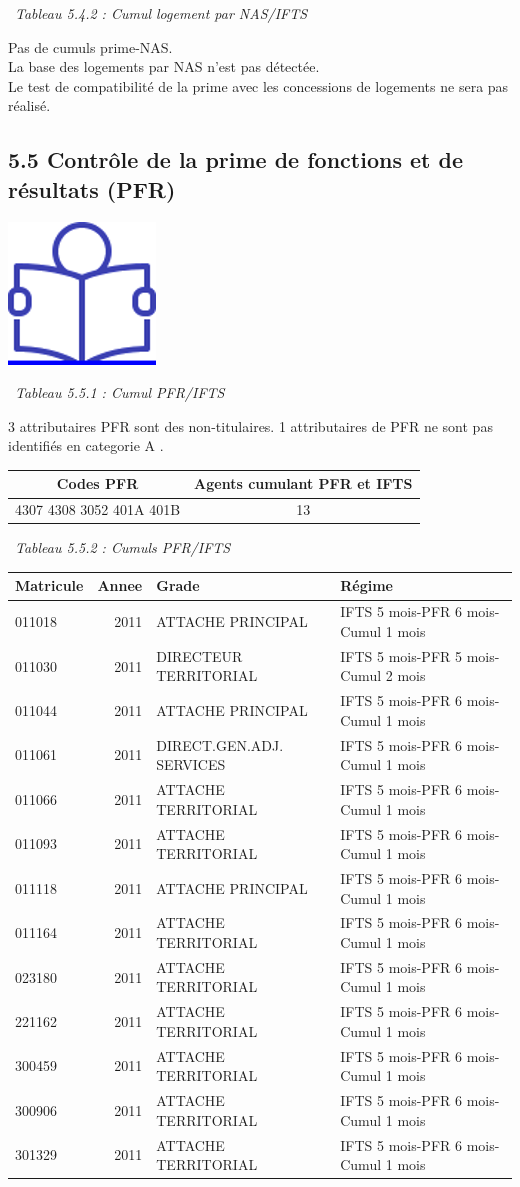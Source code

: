 ~\emph{Tableau 5.4.2 : Cumul logement par NAS/IFTS}

Pas de cumuls prime-NAS.\\
La base des logements par NAS n'est pas détectée.\\
Le test de compatibilité de la prime avec les concessions de logements
ne sera pas réalisé.

\hypertarget{controle-de-la-prime-de-fonctions-et-de-resultats-pfr}{%
\subsection{5.5 Contrôle de la prime de fonctions et de résultats
(PFR)}\label{controle-de-la-prime-de-fonctions-et-de-resultats-pfr}}

\href{../Docs/Notices/fiche_PFR.odt}{\includegraphics{icones/Notice.png}}

~\emph{Tableau 5.5.1 : Cumul PFR/IFTS}

3 attributaires PFR sont des non-titulaires. 1 attributaires de PFR ne
sont pas identifiés en categorie A .

\begin{longtable}[]{@{}cc@{}}
\toprule
Codes PFR & Agents cumulant PFR et IFTS\tabularnewline
\midrule
\endhead
4307 4308 3052 401A 401B & 13\tabularnewline
\bottomrule
\end{longtable}

~\emph{Tableau 5.5.2 : Cumuls PFR/IFTS}

\begin{longtable}[]{@{}lrll@{}}
\toprule
Matricule & Annee & Grade & Régime\tabularnewline
\midrule
\endhead
011018 & 2011 & ATTACHE PRINCIPAL & IFTS 5 mois-PFR 6 mois-Cumul 1
mois\tabularnewline
011030 & 2011 & DIRECTEUR TERRITORIAL & IFTS 5 mois-PFR 5 mois-Cumul 2
mois\tabularnewline
011044 & 2011 & ATTACHE PRINCIPAL & IFTS 5 mois-PFR 6 mois-Cumul 1
mois\tabularnewline
011061 & 2011 & DIRECT.GEN.ADJ. SERVICES & IFTS 5 mois-PFR 6 mois-Cumul
1 mois\tabularnewline
011066 & 2011 & ATTACHE TERRITORIAL & IFTS 5 mois-PFR 6 mois-Cumul 1
mois\tabularnewline
011093 & 2011 & ATTACHE TERRITORIAL & IFTS 5 mois-PFR 6 mois-Cumul 1
mois\tabularnewline
011118 & 2011 & ATTACHE PRINCIPAL & IFTS 5 mois-PFR 6 mois-Cumul 1
mois\tabularnewline
011164 & 2011 & ATTACHE TERRITORIAL & IFTS 5 mois-PFR 6 mois-Cumul 1
mois\tabularnewline
023180 & 2011 & ATTACHE TERRITORIAL & IFTS 5 mois-PFR 6 mois-Cumul 1
mois\tabularnewline
221162 & 2011 & ATTACHE TERRITORIAL & IFTS 5 mois-PFR 6 mois-Cumul 1
mois\tabularnewline
300459 & 2011 & ATTACHE TERRITORIAL & IFTS 5 mois-PFR 6 mois-Cumul 1
mois\tabularnewline
300906 & 2011 & ATTACHE TERRITORIAL & IFTS 5 mois-PFR 6 mois-Cumul 1
mois\tabularnewline
301329 & 2011 & ATTACHE TERRITORIAL & IFTS 5 mois-PFR 6 mois-Cumul 1
mois\tabularnewline
\bottomrule
\end{longtable}

